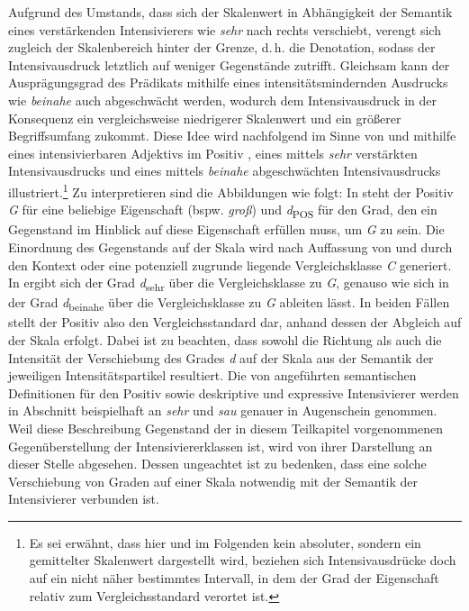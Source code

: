 Aufgrund des Umstands, dass sich der Skalenwert in Abhängigkeit der Semantik eines verstärkenden Intensivierers wie \textit{sehr} nach rechts verschiebt, verengt sich zugleich der Skalenbereich hinter der Grenze, d.\,h. die Denotation, sodass der Intensivausdruck letztlich auf weniger Gegenstände zutrifft. Gleichsam kann der Ausprägungsgrad des Prädikats mithilfe eines intensitätsmindernden Ausdrucks wie \textit{beinahe} auch abgeschwächt werden, wodurch dem Intensivausdruck in der Konsequenz ein vergleichsweise niedrigerer Skalenwert und ein größerer Begriffsumfang zukommt. Diese Idee wird nachfolgend im Sinne von {\citet[59f.]{Stechow.1984}} und {\citet[132f.]{Gutzmann.2019a}} mithilfe eines intensivierbaren Adjektivs im Positiv , eines mittels \textit{sehr} verstärkten {Intensivausdrucks } und eines mittels \textit{beinahe} abgeschwächten Intensivausdrucks  illustriert.\footnote{Es sei erwähnt, dass hier und im Folgenden kein absoluter, sondern ein gemittelter Skalenwert dargestellt wird, beziehen sich Intensivausdrücke doch auf ein nicht näher bestimmtes Intervall, in dem der Grad der Eigenschaft relativ zum Vergleichsstandard verortet ist.} Zu interpretieren sind die Abbildungen wie folgt: In  steht der {Positiv \textit{G}} für eine beliebige Eigenschaft (bspw. \textit{groß}) und \textit{d}\textsubscript{POS} für den Grad, den ein Gegenstand im Hinblick auf diese Eigenschaft erfüllen muss, um \textit{G} zu sein. Die Einordnung des Gegenstands auf der Skala wird nach Auffassung von {\citet[59f.]{Stechow.1984}} und {\citet[132f.]{Gutzmann.2019a}} durch den Kontext oder eine potenziell zugrunde liegende {Vergleichsklasse \textit{C}} generiert. {In } ergibt sich der Grad \textit{d}\textsubscript{sehr} über die Vergleichsklasse zu \textit{G}, genauso wie sich in  der Grad \textit{d}\textsubscript{beinahe} über die Vergleichsklasse zu \textit{G} ableiten lässt. In beiden Fällen stellt der Positiv also den Vergleichsstandard dar, anhand dessen der Abgleich auf der Skala erfolgt. Dabei ist zu beachten, dass sowohl die Richtung als auch die Intensität der Verschiebung des Grades \textit{d} auf der Skala aus der Semantik der jeweiligen Intensitätspartikel resultiert. Die von \citet[132]{Gutzmann.2019a} angeführten semantischen Definitionen für den Positiv sowie deskriptive und expressive Intensivierer werden in Abschnitt {} beispielhaft an \textit{sehr} und \textit{sau} genauer in Augenschein genommen. Weil diese Beschreibung Gegenstand der in diesem Teilkapitel vorgenommenen {Gegenüberstellung} der Intensiviererklassen ist, wird von ihrer Darstellung an dieser Stelle  abgesehen. Dessen ungeachtet ist zu bedenken, dass eine solche Verschiebung von Graden auf einer Skala notwendig mit der Semantik der Intensivierer verbunden ist.


